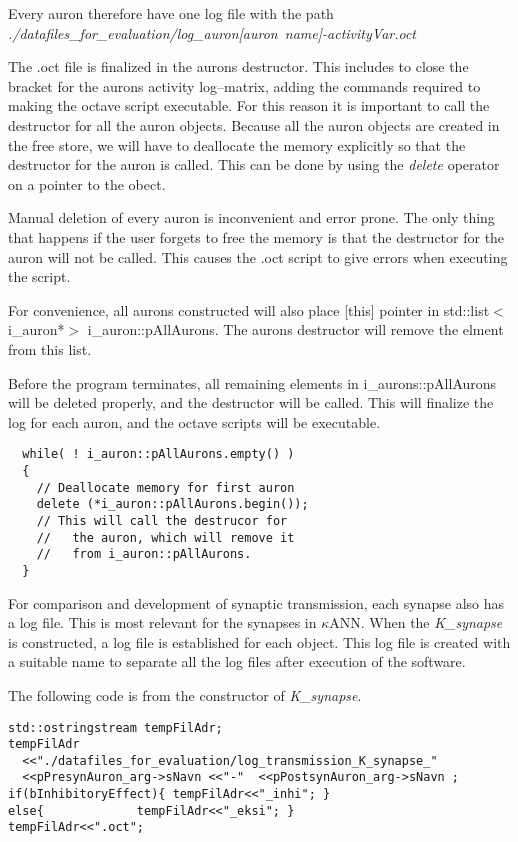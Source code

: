 Every auron therefore have one log file with the path \\ \mbox{\emph{./datafiles\_for\_evaluation/log\_auron[auron name]-activityVar.oct }}

The .oct file is finalized in the aurons destructor. This includes to close the bracket for the aurons activity log--matrix, adding the commands required to making the octave script executable.
For this reason it is important to call the destructor for all the auron objects. 
Because all the auron objects are created in the free store, we will have to deallocate the memory explicitly so that the destructor for the auron is called. 
This can be done by using the \emph{delete} operator on a pointer to the obect.

Manual deletion of every auron is inconvenient and error prone. The only thing that happens if the user forgets to free the memory is that the destructor for the auron will not be called. 
This causes the .oct script to give errors when executing the script.

For convenience, all aurons constructed will also place [this] pointer in std::list$<$i\_auron*$>$ i\_auron::pAllAurons.
The aurons destructor will remove the elment from this list.

Before the program terminates, all remaining elements in i\_aurons::pAllAurons will be deleted properly, and the destructor will be called.
This will finalize the log for each auron, and the octave scripts will be executable.

\begin{lstlisting}
  while( ! i_auron::pAllAurons.empty() ) 
  { 
    // Deallocate memory for first auron
    delete (*i_auron::pAllAurons.begin()); 
    // This will call the destrucor for
    //   the auron, which will remove it
    //   from i_auron::pAllAurons.
  }   
\end{lstlisting}

For comparison and development of synaptic transmission, each synapse also has a log file. This is most relevant for the synapses in $\kappa$ANN.
When the \emph{K\_synapse} is constructed, a log file is established for each object. This log file is created with a suitable name to separate all the log files after execution of the software.

The following code is from the constructor of \emph{K\_synapse}.
\begin{lstlisting}
std::ostringstream tempFilAdr;
tempFilAdr
  <<"./datafiles_for_evaluation/log_transmission_K_synapse_" 
  <<pPresynAuron_arg->sNavn <<"-"  <<pPostsynAuron_arg->sNavn ;
if(bInhibitoryEffect){ tempFilAdr<<"_inhi"; }
else{ 			  tempFilAdr<<"_eksi"; }
tempFilAdr<<".oct";
\end{lstlisting}

